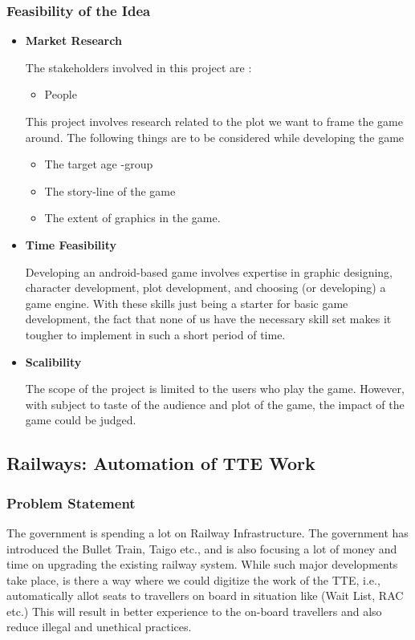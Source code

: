 \documentclass{article}
\begin{document}
\subsubsection{Feasibility of the Idea}
\begin{itemize}
    \item \textbf{Market Research}
    \par The stakeholders involved in this project are :
    \begin{itemize}
        \item People
    \end{itemize}
    \par This project involves research related to the plot we want to frame the game around. The following things are to be considered while developing the game
        \begin{itemize}
            \item The target age -group
            \item The story-line of the game
            \item The extent of graphics in the game.
        \end{itemize}
    
    \item \textbf{Time Feasibility}
    \par Developing an android-based game involves expertise in graphic designing, character development, plot development,
and choosing (or developing) a game engine.  With these skills just being a starter for basic game development, the fact
that none of us have the necessary skill set makes it tougher to implement in such a short period of time.
\item \textbf{Scalibility}
\par The scope of the project is limited to the users who play the game. However, with subject to taste of the audience and plot of the game, the impact of the game could be judged.
\end{itemize}


\subsection{Railways: Automation of TTE Work}
\subsubsection{Problem Statement}
\par The government is spending a lot on Railway Infrastructure. The government has introduced the Bullet Train, Taigo etc., and is also focusing a lot of money and time on upgrading the existing railway system. While such major developments take place, is there a way where we could digitize the work of the TTE, i.e., automatically allot seats to travellers on board in situation like (Wait List, RAC etc.) This will result in better experience to the on-board travellers and also reduce illegal and unethical practices.
\end{document}

